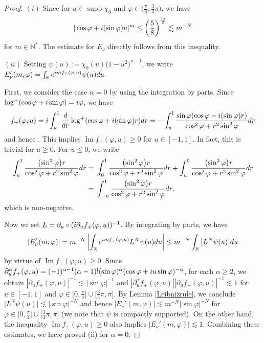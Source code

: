 \documentclass[10pt,a4paper]{article}
\numberwithin{equation}{section}
\def\R{\mathbb{R}}%
\DeclareMathOperator{\supp}{supp}%
\DeclareMathOperator{\im}{Im}%
\def\a{\alpha}
\def\f{\varphi}
\def\g{\psi}
\def\n{\nu}
\def\pa{\partial}
\begin{document}
\begin{proof}
 $(i)$ Since \smash{$|\cos\f+{\rm i}(\sin \f)u|\leq \sqrt{\frac{5}{8}}$} for $u\in \supp \chi_0$ and $\f\in \bigl(\frac{\pi}{4}, \frac{3}{4}\pi\bigr)$, we have
 \[
|\cos\f+{\rm i}(\sin \f)u|^m\leq \left(\frac{5}{8}\right)^{\frac{m}{2}}\lesssim m^{-N}
\]
 for $m\in\mathbb{N}^*$. The estimate for $E_{\n}$ directly follows from this inequality.

 $(ii)$ Setting $\g(u):=\chi_0(u)\bigl(1-u^2\bigr)^{\n-1}$, we write $E_{\n}'(m,\f)=\int_{\R}{\rm e}^{{\rm i}mf_{+}(\f,u)}\g(u){\rm d}u$.

First, we consider the case $\a=0$ by using the integration by parts.
Since $\log^+(\cos \f+{\rm i}\sin \f)={\rm i}\f$, we have
\begin{align}\label{f_+rep}
f_+(\f,u)={\rm i}\int_u^1\frac{{\rm d}}{{\rm d}r}\log^+(\cos \f+{\rm i}(\sin \f) r){\rm d}r=-\int_u^1\frac{\sin\f(\cos \f-{\rm i}(\sin \f) r)}{\cos^2 \f+r^2\sin^2 \f }{\rm d}r
\end{align}
and hence \smash{$\im f_+(\f,u)=\int_u^1\frac{(\sin^2 \f) r}{\cos^2 \f+r^2\sin^2 \f }{\rm d}r$}. This implies $\im f_+(\f,u)\geq 0$ for $u\in [-1,1]$. In fact, this is trivial for $u\geq 0$. For $u\leq 0$, we write
\begin{align*}
\int_u^1\frac{\bigl(\sin^2 \f\bigr) r}{\cos^2 \f+r^2\sin^2 \f }{\rm d}r={}&\int_0^1\frac{\bigl(\sin^2 \f\bigr) r}{\cos^2 \f+r^2\sin^2 \f }{\rm d}r+\int_u^0\frac{\bigl(\sin^2 \f\bigr) r}{\cos^2 \f+r^2\sin^2 \f }{\rm d}r\\
={}&\int_{-u}^1\frac{\bigl(\sin^2 \f\bigr) r}{\cos^2 \f+r^2\sin^2 \f }{\rm d}r,
\end{align*}
 which is non-negative.

Now we set $L=\pa_u\circ ({\rm i}\pa_uf_+(\f,u))^{-1}$. By integrating by parts, we have
\[
|E_{\n}'(m,\f)|=m^{-N}\left|\int_{\R}{\rm e}^{{\rm i}mf_{+}(\f,u)} L^N\g(u){\rm d}u\right|\leq m^{-N}\int_{\R}\big| L^N\g(u)\big|{\rm d}u
\]
 by virtue of $\im f_+(\f,u)\geq 0$. Since $\pa_u^{\a}f_+(\f,u)=(-1)^{\a-1}(\a-1)!(\sin\f)^{\a}(\cos \f+{\rm i}u\sin \f )^{-\a}$, for each $\a\geq 2$, we obtain $|\pa_uf_+(\f,u)|^{-1}\lesssim |\sin \f|^{-1}$ and $|\pa_u^{\a}f_+(\f,u)||\pa_uf_+(\f,u)|^{-1} \lesssim 1$ for $u\in [-1,1]$ and $\f\in \bigl[0,\frac{\pi}{4}\bigr]\cup \bigl[\frac{3}{4}\pi,\pi\bigr]$. By Lemma \ref{Leibnizrule}, we conclude $\big| L^N\g(u)\big|\lesssim |\sin\f|^{-N}$ and hence $|E_{\n}'(m,\f)|\lesssim m^{-N}|\sin\f|^{-N}$ for $\f\in \bigl[0,\frac{\pi}{4}\bigr]\cup \bigl[\frac{3}{4}\pi,\pi\bigr]$ (we note that $\g$ is compactly supported). On the other hand, the inequality $\im f_+(\f,u)\geq 0$ also implies $|E_{\n}'(m,\f)|\lesssim 1$. Combining these estimates, we have proved (ii) for $\a=0$.


\end{proof}
\end{document}
